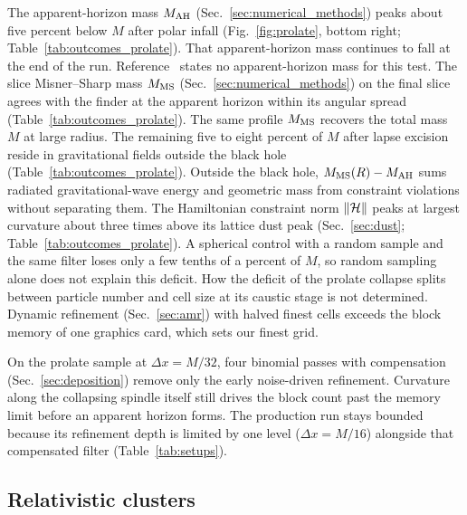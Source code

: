 The apparent-horizon mass $M_{\rm AH}$ (Sec.~\ref{sec:numerical_methods}) peaks about five percent below $M$ after polar infall (Fig.~\ref{fig:prolate}, bottom right; Table~\ref{tab:outcomes_prolate}). That apparent-horizon mass continues to fall at the end of the run. Reference~\cite{Wu:2026nrpic} states no apparent-horizon mass for this test. The slice Misner--Sharp mass $M_{\rm MS}$ (Sec.~\ref{sec:numerical_methods}) on the final slice agrees with the finder at the apparent horizon within its angular spread (Table~\ref{tab:outcomes_prolate}). The same profile $M_{\rm MS}$ recovers the total mass $M$ at large radius. The remaining five to eight percent of $M$ after lapse excision reside in gravitational fields outside the black hole (Table~\ref{tab:outcomes_prolate}). Outside the black hole, $M_{\rm MS}(R) - M_{\rm AH}$ sums radiated gravitational-wave energy and geometric mass from constraint violations without separating them. The Hamiltonian constraint norm $\|\mathcal{H}\|$ peaks at largest curvature about three times above its lattice dust peak (Sec.~\ref{sec:dust}; Table~\ref{tab:outcomes_prolate}). A spherical control with a random sample and the same filter loses only a few tenths of a percent of $M$, so random sampling alone does not explain this deficit. How the deficit of the prolate collapse splits between particle number and cell size at its caustic stage is not determined. Dynamic refinement (Sec.~\ref{sec:amr}) with halved finest cells exceeds the block memory of one graphics card, which sets our finest grid.

On the prolate sample at $\Delta x = M/32$, four binomial passes with compensation (Sec.~\ref{sec:deposition}) remove only the early noise-driven refinement. Curvature along the collapsing spindle itself still drives the block count past the memory limit before an apparent horizon forms. The production run stays bounded because its refinement depth is limited by one level ($\Delta x = M/16$) alongside that compensated filter (Table~\ref{tab:setups}).

\subsection{Relativistic clusters}\label{sec:clusters}

